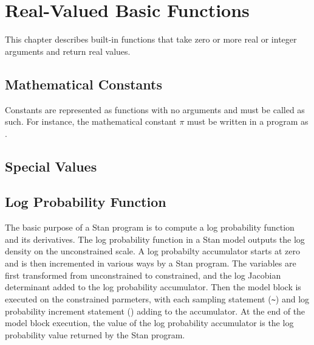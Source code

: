 \chapter{Real-Valued Basic Functions}

\noindent
This chapter describes built-in functions that take zero or more real
or integer arguments and return real values.  

\section{Mathematical Constants}\label{built-in-constants.section}

Constants are represented as functions with no arguments and must be
called as such.  For instance, the mathematical constant $\pi$ must be
written in a \Stan program as .

%
\begin{description}
%
%
%
%
%
%
\end{description}

\section{Special Values}

\begin{description}
%
%
%
%
\end{description}


\section{Log Probability Function}\label{get-lp.section}

The basic purpose of a Stan program is to compute a log probability
function and its derivatives.  The log probability function in a Stan
model outputs the log density on the unconstrained scale.  A log
probabilty accumulator starts at zero and is then incremented in
various ways by a Stan program.  The variables are first transformed
from unconstrained to constrained, and the log Jacobian determinant
added to the log probability accumulator.  Then the model block is
executed on the constrained parmeters, with each sampling statement
(\Verb|~|) and log probability increment statement
() adding to the accumulator.  At the end
of the model block execution, the value of the log probability
accumulator is the log probability value returned by the Stan program.

